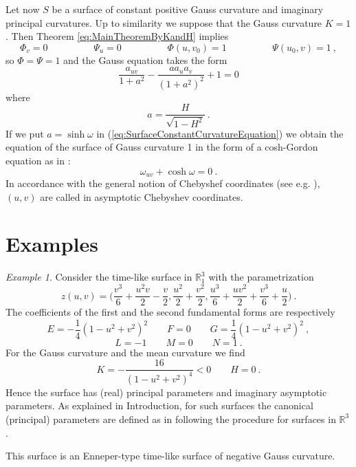 \documentclass[12pt]{amsart}
\theoremstyle{definition}
\theoremstyle{remark}
\newtheorem{example}{Example}[section]
\begin{document}
Let now $S$ be a surface of constant positive Gauss curvature and imaginary principal curvatures. 
Up to similarity we suppose that the Gauss curvature $K=1$. 
Then Theorem \ref{eq:MainTheoremByKandH} implies
$$
	\Phi_v=0 \hspace{2cm}  \Psi_u=0 \hspace{2cm}   \Phi(u,v_0)=1   \hspace{2cm}   \Psi(u_0,v)=1 \ ,
$$
so $\Phi=\Psi=1$ and the Gauss equation takes the form
\begin{equation} \label{eq:SurfaceConstantCurvatureEquation}
	 \frac{a_{uv}}{1+a^2}-\frac{aa_ua_v}{(1+a^2)^2}  +1=0    
\end{equation}
where
$$
	a=\frac{H}{\sqrt{1-H^2}} \ .
$$	
If we put $a=\sinh \omega$ in (\ref{eq:SurfaceConstantCurvatureEquation}) we obtain the equation of the surface of Gauss curvature 1
in the form of  a cosh-Gordon equation as in \cite{G-H-I}:
$$
	\omega_{uv}+\cosh\omega = 0 \ .
$$
In  accordance with the general notion of Chebyshef coordinates (see e.g. \cite{Gray-A-S}),  
$(u,v)$ are called in  \cite{G-H-I} asymptotic Chebyshev coordinates.


\vspace{0.5cm}




\setcounter{equation}{0}

\section{Examples}




\begin{example} \label{ex:2}  Consider the time-like surface in $\mathbb R^3_1$  with the parametrization
$$
	z(u,v)=\Big( \frac{v^3}6+\frac{u^2v}2-\frac v2,\frac{u^2}2+\frac{v^2}2,\frac{u^3}6+\frac{uv^2}2+\frac{v^3}6+\frac u2 \Big) \ .
$$
The coefficients of the first and the second fundamental forms are respectively
$$
	E= - \frac14(1-u^2+v^2)^2 \qquad F=0  \qquad G= \frac14(1-u^2+v^2)^2  \ ,
$$
$$
	L=-1  \qquad M=0  \qquad  N=1 \ .
$$
For the Gauss curvature and the mean curvature we find 
$$
	K=-\frac{16}{(1-u^2+v^2)^4}<0 \qquad  H=0   \ .
$$
Hence the surface has (real) principal parameters and imaginary asymptotic parameters. 
As explained in Introduction, for such surfaces the canonical (principal) parameters are defined 
as in \cite{G-V-2013} following the procedure for surfaces in $\mathbb R^3$.

This surface is an Enneper-type time-like surface of negative Gauss curvature.

\end{example}
\end{document}
